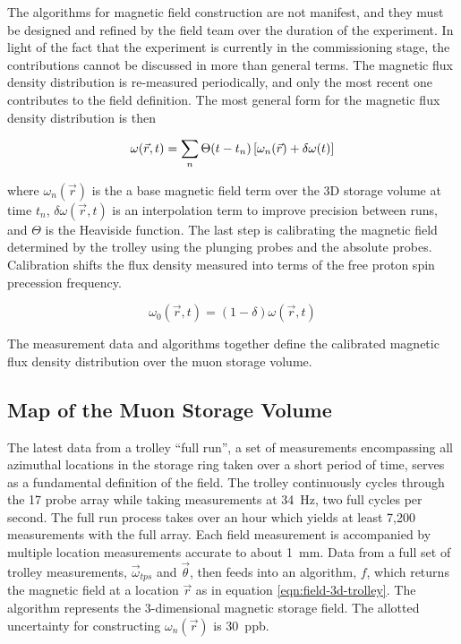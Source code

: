 The algorithms for magnetic field construction are not manifest, and they must be designed and refined by the field team over the duration of the experiment.  In light of the fact that the experiment is currently in the commissioning stage, the contributions cannot be discussed in more than general terms.  The magnetic flux density distribution is re-measured periodically, and only the most recent one contributes to the field definition. The most general form for the magnetic flux density distribution is then

\begin{equation}
\label{eqn:field-construction}
\omega(\vec{r}, t) = \sum_n \Theta(t - t_n) \\
\left[\omega_{n}(\vec{r}) + \delta \omega(t) \right]
\end{equation}

\noindent
where $\omega_{n}(\vec{r})$ is the a base magnetic field term over the 3D storage volume at time $t_n$, $\delta \omega(\vec{r}, t)$ is an interpolation term to improve precision between runs, and $\Theta$ is the Heaviside function.  The last step is calibrating the magnetic field determined by the trolley using the plunging probes and the absolute probes. Calibration shifts the flux density measured into terms of the free proton spin precession frequency.

\begin{equation}
\label{eqn:field-calibration}
\omega_0(\vec{r}, t) = (1 - \delta) \omega(\vec{r}, t)
\end{equation}

\noindent The measurement data and algorithms together define the calibrated magnetic flux density distribution over the muon storage volume.

\subsection{Map of the Muon Storage Volume}

The latest data from a trolley ``full run'', a set of measurements encompassing all azimuthal locations in the storage ring taken over a short period of time, serves as a fundamental definition of the field.  The trolley continuously cycles through the 17 probe array while taking measurements at \SI{34}{\Hz}, two full cycles per second.  The full run process takes over an hour which yields at least 7,200 measurements with the full array. Each field measurement is accompanied by multiple location measurements accurate to about \SI{1}{\mm}.  Data from a full set of trolley measurements, $\vec{\omega}_{tps}$ and $\vec{\theta}$, then feeds into an algorithm, $f$, which returns the magnetic field at a location $\vec{r}$ as in equation \ref{eqn:field-3d-trolley}.  The algorithm represents the 3-dimensional magnetic storage field.  The allotted uncertainty for constructing $\omega_{n}(\vec{r})$ is \SI{30}{ppb}.

